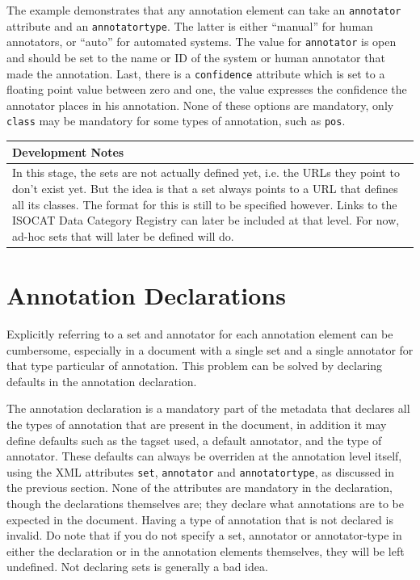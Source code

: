\documentclass[a4paper,12pt]{report}
\newenvironment{devnotes}
{
\begin{center}
    \begin{tabular}[h!]{|p{0.8\textwidth}|}
    \hline
    {\bf Development Notes}\\\hline}
{   \\\hline
    \end{tabular}
\end{center}}
\begin{document}
The example demonstrates that any annotation element can take an \texttt{annotator} attribute and an \texttt{annotatortype}. The latter is either ``manual'' for human annotators, or ``auto'' for automated systems.  The value for \texttt{annotator} is open and should be set to the name or ID of the system or human annotator that made the annotation. Last, there is a \texttt{confidence} attribute which is set to a floating point value between zero and one, the value expresses the confidence the annotator places in his annotation. None of these options are mandatory, only \texttt{class} may be mandatory for some types of annotation, such as \texttt{pos}.

\begin{devnotes}
In this stage, the sets are not actually defined yet, i.e. the URLs they point to don't exist yet. But the idea is that a set always points to a URL that defines all its classes. The format for this is still to be specified however. Links to the ISOCAT Data Category Registry can later be included at that level. For now, ad-hoc sets that will later be defined will do.
\end{devnotes}


\section{Annotation Declarations}

Explicitly referring to a set and annotator for each annotation element can be cumbersome, especially in a document with a single set and a single annotator for that type particular of annotation. This problem can be solved by declaring defaults in the annotation declaration.

The annotation declaration is a mandatory part of the metadata that declares all the types of annotation that are present in the document, in addition it may define defaults such as the tagset used, a default annotator, and the type of annotator. These defaults can always be overriden at the annotation level itself, using the XML attributes \texttt{set}, \texttt{annotator} and \texttt{annotatortype}, as discussed in the previous section. None of the attributes are mandatory in the declaration, though the declarations themselves are; they declare what annotations are to be expected in the document. Having a type of annotation that is not declared is invalid. Do note that if you do not specify a set, annotator or annotator-type in either the declaration or in the annotation elements themselves, they will be left undefined. Not declaring sets is generally a bad idea.  
\end{document}
